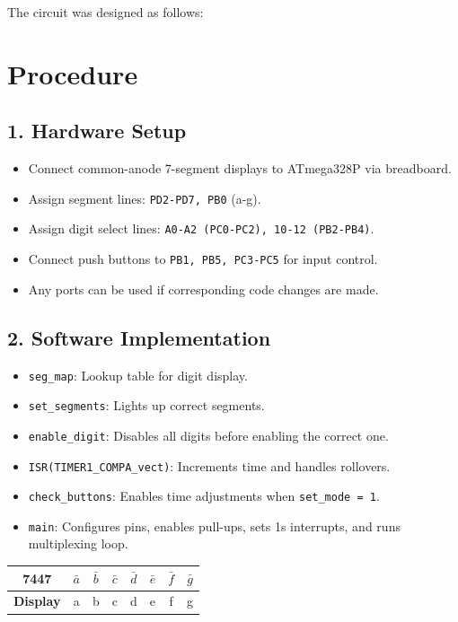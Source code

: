 \documentclass[journal]{IEEEtran}
\begin{document}
The circuit was designed as follows:
\section{Procedure}

\subsection*{1. Hardware Setup}
\begin{itemize}
    \item Connect common-anode 7-segment displays to ATmega328P via breadboard.
    \item Assign segment lines: \texttt{PD2-PD7, PB0} (a-g).
    \item Assign digit select lines: \texttt{A0-A2 (PC0-PC2), 10-12 (PB2-PB4)}.
    \item Connect push buttons to \texttt{PB1, PB5, PC3-PC5} for input control.
    \item Any ports can be used if corresponding code changes are made.
\end{itemize}

\subsection*{2. Software Implementation}
\begin{itemize}
    \item \texttt{seg\_map}: Lookup table for digit display.
    \item \texttt{set\_segments}: Lights up correct segments.
    \item \texttt{enable\_digit}: Disables all digits before enabling the correct one.
    \item \texttt{ISR(TIMER1\_COMPA\_vect)}: Increments time and handles rollovers.
    \item \texttt{check\_buttons}: Enables time adjustments when \texttt{set\_mode = 1}.
    \item \texttt{main}: Configures pins, enables pull-ups, sets 1s interrupts, and runs multiplexing loop.
\end{itemize}


\begin{table}[h]
    \centering
    \begin{tabular}{|c|c|c|c|c|c|c|c|}
        \hline
        \textbf{7447} & $\bar{a}$ & $\bar{b}$ & $\bar{c}$ & $\bar{d}$ & $\bar{e}$ & $\bar{f}$ & $\bar{g}$ \\ \hline
        \textbf{Display} & a & b & c & d & e & f & g \\ \hline
    \end{tabular}
\end{table}
\end{document}
